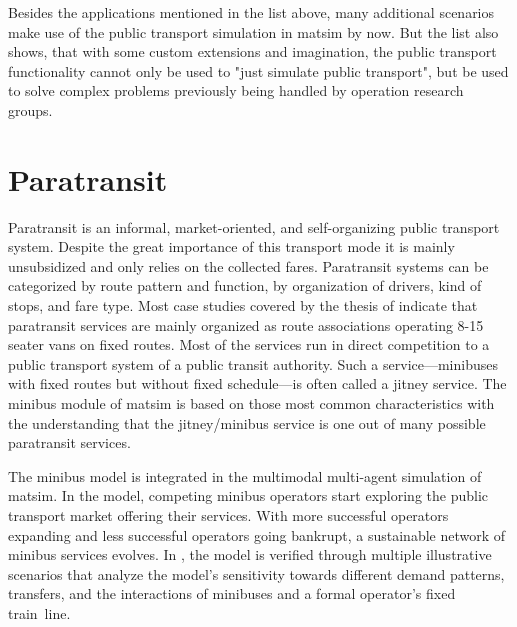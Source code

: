 Besides the applications mentioned in the list above, many additional scenarios
make use of the public transport simulation in \gls{matsim} by now. But the list also
shows, that with some custom extensions and imagination, the public transport
functionality cannot only be used to "just simulate public transport", but be
used to solve complex problems previously being handled by operation research
groups.

\section{Paratransit}
\label{sec:paratransit}
Paratransit is an informal, market-oriented, and self-organizing public transport system. 
Despite the great importance of this transport mode it is mainly unsubsidized and only relies on the collected fares. 
Paratransit systems can be categorized by route pattern and function, by organization of drivers, kind of stops, and fare type. 
Most case studies covered by the thesis of \citet[][]{Neumann_PhDThesis_2014} indicate that paratransit services are mainly 
organized as route associations operating 8-15\,seater vans on fixed routes. Most of the services run in direct competition to a
public transport system of a public transit authority. Such a service---minibuses with fixed routes but without fixed schedule---is often called a jitney service.
The minibus module of \gls{matsim} is based on those most common characteristics with the understanding that the jitney/minibus
service is one out of many possible paratransit services.

The minibus model is integrated in the \gls{multimodal} multi-agent simulation of \gls{matsim}. In the model, competing minibus operators start exploring the public transport market offering their services. With more successful operators expanding and less successful operators going bankrupt, a sustainable network of minibus services evolves. In \citet[][]{Neumann_PhDThesis_2014}, the model is verified through multiple illustrative scenarios that analyze the model's sensitivity towards different demand patterns, transfers, and the interactions of minibuses and a formal operator's fixed train~line.

